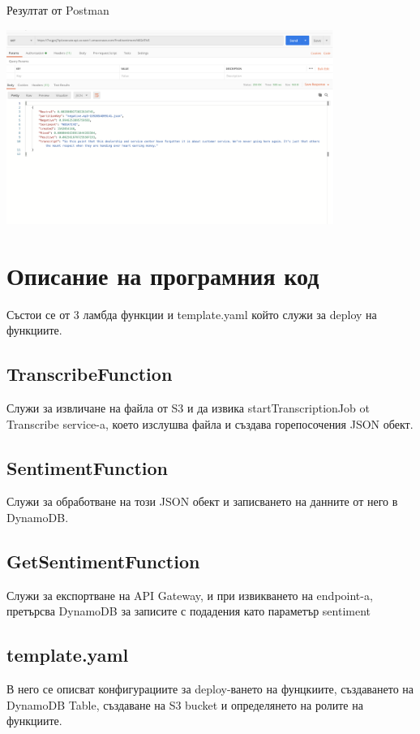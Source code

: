 \documentclass[12pt]{article}
\begin{document}
Резултат от Postman

 \includegraphics[width=0.8\textwidth]{postman_result.png}
 
\section{Описание на програмния код}

Състои се от 3 ламбда функции и template.yaml който служи за deploy на функциите.

\subsection{TranscribeFunction}
 Служи за извличане на файла от S3 и да извика startTranscriptionJob ot Transcribe service-a, което изслушва файла и създава горепосочения JSON обект.

\subsection{SentimentFunction}
Служи за обработване на този JSON обект и записването на данните от него в DynamoDB.

\subsection{GetSentimentFunction}
Служи за експортване на API Gateway, и при извикването на endpoint-a, претърсва DynamoDB за записите с подадения като параметър sentiment

\subsection{template.yaml}
В него се описват конфигурациите за deploy-ването на фунцкиите, създаването на DynamoDB Table, създаване на S3 bucket и определянето на ролите на функциите.
\end{document}
